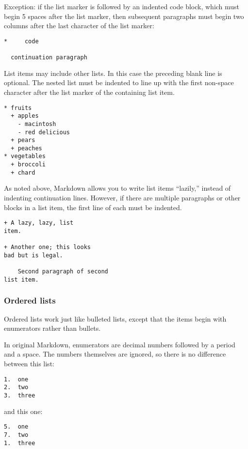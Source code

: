 \documentclass[
]{article}
\begin{document}
Exception: if the list marker is followed by an indented code block,
which must begin 5 spaces after the list marker, then subsequent
paragraphs must begin two columns after the last character of the list
marker:

\begin{verbatim}
*     code

  continuation paragraph
\end{verbatim}

List items may include other lists. In this case the preceding blank
line is optional. The nested list must be indented to line up with the
first non-space character after the list marker of the containing list
item.

\begin{verbatim}
* fruits
  + apples
    - macintosh
    - red delicious
  + pears
  + peaches
* vegetables
  + broccoli
  + chard
\end{verbatim}

As noted above, Markdown allows you to write list items ``lazily,''
instead of indenting continuation lines. However, if there are multiple
paragraphs or other blocks in a list item, the first line of each must
be indented.

\begin{verbatim}
+ A lazy, lazy, list
item.

+ Another one; this looks
bad but is legal.

    Second paragraph of second
list item.
\end{verbatim}

\subsubsection{Ordered lists}\label{ordered-lists}

Ordered lists work just like bulleted lists, except that the items begin
with enumerators rather than bullets.

In original Markdown, enumerators are decimal numbers followed by a
period and a space. The numbers themselves are ignored, so there is no
difference between this list:

\begin{verbatim}
1.  one
2.  two
3.  three
\end{verbatim}

and this one:

\begin{verbatim}
5.  one
7.  two
1.  three
\end{verbatim}
\end{document}
